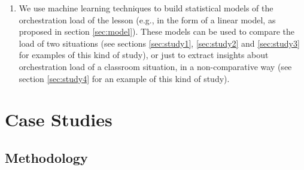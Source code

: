 \documentclass[10pt,journal,compsoc]{IEEEtran}
\begin{document}
\begin{enumerate}
\item We use machine learning techniques to build statistical models of the orchestration load of the lesson (e.g., in the form of a linear model, as proposed in section \ref{sec:model}). These models can be used to compare the load of two situations (see sections \ref{sec:study1}, \ref{sec:study2} and \ref{sec:study3} for examples of this kind of study), or just to extract insights about orchestration load of a classroom situation, in a non-comparative way (see section \ref{sec:study4} for an example of this kind of study).

\end{enumerate}




\section{Case Studies}
\label{sec:eval}

\subsection{Methodology}
\end{document}
